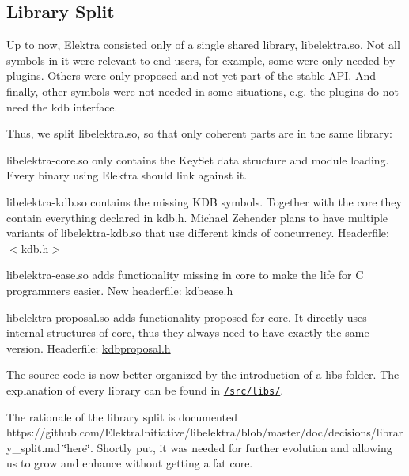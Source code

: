 \subsection*{Library Split}

Up to now, Elektra consisted only of a single shared library, {\ttfamily libelektra.\+so}. Not all symbols in it were relevant to end users, for example, some were only needed by plugins. Others were only proposed and not yet part of the stable A\+PI. And finally, other symbols were not needed in some situations, e.\+g. the plugins do not need the {\ttfamily kdb} interface.

Thus, we split {\ttfamily libelektra.\+so}, so that only coherent parts are in the same library\+:


\begin{DoxyItemize}
\item {\ttfamily libelektra-\/core.\+so} only contains the {\ttfamily Key\+Set} data structure and module loading. Every binary using Elektra should link against it.
\item {\ttfamily libelektra-\/kdb.\+so} contains the missing {\ttfamily K\+DB} symbols. Together with the {\ttfamily core} they contain everything declared in {\ttfamily kdb.\+h}. Michael Zehender plans to have multiple variants of {\ttfamily libelektra-\/kdb.\+so} that use different kinds of concurrency. Headerfile\+: {\ttfamily $<$kdb.\+h$>$}
\item {\ttfamily libelektra-\/ease.\+so} adds functionality missing in {\ttfamily core} to make the life for C programmers easier. New headerfile\+: {\ttfamily kdbease.\+h}
\item {\ttfamily libelektra-\/proposal.\+so} adds functionality proposed for {\ttfamily core}. It directly uses internal structures of {\ttfamily core}, thus they always need to have exactly the same version. Headerfile\+: {\ttfamily \hyperlink{kdbproposal_8h}{kdbproposal.\+h}}
\end{DoxyItemize}

The source code is now better organized by the introduction of a {\ttfamily libs} folder. The explanation of every library can be found in \href{https://github.com/ElektraInitiative/libelektra/tree/master/src/libs}{\tt /src/libs/}.

The rationale of the library split is documented https\+://github.com/\+Elektra\+Initiative/libelektra/blob/master/doc/decisions/library\+\_\+split.\+md \char`\"{}here\char`\"{}. Shortly put, it was needed for further evolution and allowing us to grow and enhance without getting a fat core.

